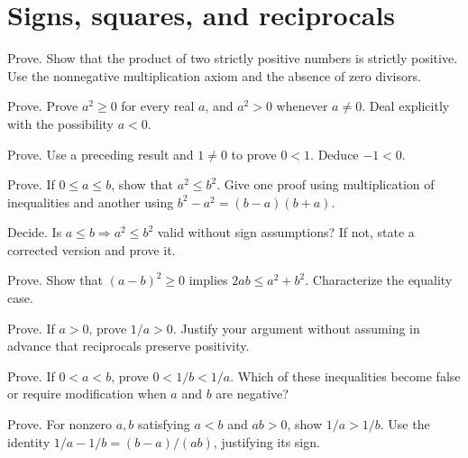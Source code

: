 \documentclass{workbook}
\begin{document}
\section{Signs, squares, and reciprocals}

\begin{problem}{Prove.}
Show that the product of two strictly positive numbers is strictly
positive. Use the nonnegative multiplication axiom and the absence of
zero divisors.
\end{problem}

\begin{problem}{Prove.}
Prove $a^2\geq0$ for every real $a$, and $a^2>0$ whenever $a\neq0$.
Deal explicitly with the possibility $a<0$.
\end{problem}

\begin{problem}{Prove.}
Use a preceding result and $1\neq0$ to prove $0<1$.
Deduce $-1<0$.
\end{problem}

\begin{problem}{Prove.}
If $0\leq a\leq b$, show that $a^2\leq b^2$.
Give one proof using multiplication of inequalities and another using
$b^2-a^2=(b-a)(b+a)$.
\end{problem}

\begin{problem}{Decide.}
Is $a\leq b\Rightarrow a^2\leq b^2$ valid without sign assumptions?
If not, state a corrected version and prove it.
\end{problem}

\begin{problem}{Prove.}
Show that $(a-b)^2\geq0$ implies $2ab\leq a^2+b^2$.
Characterize the equality case.
\end{problem}

\begin{problem}{Prove.}
If $a>0$, prove $1/a>0$. Justify your argument without assuming in
advance that reciprocals preserve positivity.
\end{problem}

\begin{problem}{Prove.}
If $0<a<b$, prove $0<1/b<1/a$.
Which of these inequalities become false or require modification when
$a$ and $b$ are negative?
\end{problem}

\begin{problem}{Prove.}
For nonzero $a,b$ satisfying $a<b$ and $ab>0$, show $1/a>1/b$.
Use the identity $1/a-1/b=(b-a)/(ab)$, justifying its sign.
\end{problem}
\end{document}
